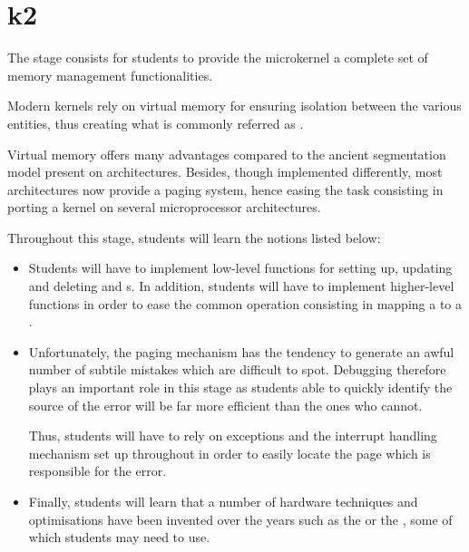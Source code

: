 %
%
%
%
%
%

%
%

\chapter{k2}
\label{chapter:k2}

The  stage consists for students to provide the microkernel a
complete set of memory management functionalities.

Modern kernels rely on virtual memory for ensuring isolation between the
various entities, thus creating what is commonly referred as
.

Virtual memory offers many advantages compared to the ancient segmentation
model present on  architectures. Besides, though implemented
differently, most architectures now provide a paging system, hence easing
the task consisting in porting a kernel on several microprocessor
architectures.

Throughout this stage, students will learn the notions listed below:

\begin{itemize}
  \item

    \-

    Students will have to implement low-level functions for setting up,
    updating and deleting  and
    s. In addition, students will have to
    implement higher-level functions in order to ease the common operation
    consisting in mapping a  to a .
  \item

    \-

    Unfortunately, the paging mechanism has the tendency to generate an
    awful number of subtile mistakes which are difficult to spot. Debugging
    therefore plays an important role in this stage as students able to
    quickly identify the source of the error will be far more efficient than
    the ones who cannot.

    \-

    Thus, students will have to rely on exceptions and the interrupt handling
    mechanism set up throughout  in order to easily locate the
    page which is responsible for the error.
  \item

    \-

    Finally, students will learn that a number of hardware techniques
    and optimisations have been invented over the years such as the
     or the , some of which
    students may need to use.
\end{itemize}


